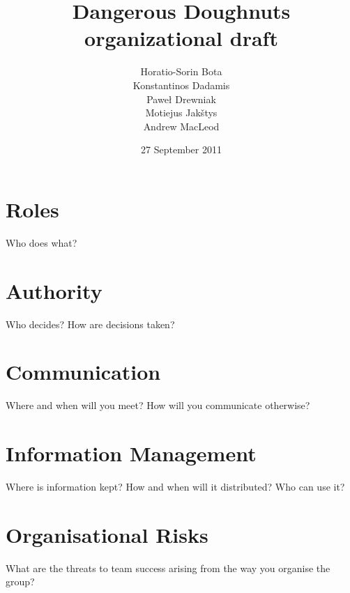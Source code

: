 \documentclass{article}
\begin{document}
\title{Dangerous Doughnuts organizational draft}
\author{Horatio-Sorin Bota \\
		Konstantinos Dadamis \\
		Paweł Drewniak \\
		Motiejus Jakštys \\
		Andrew MacLeod}

\date{27 September 2011}
\maketitle

\section{Roles}

Who does what?


\section{Authority}

Who decides?  How are decisions taken?


\section{Communication}

Where and when will you meet?  How will you communicate otherwise?


\section{Information Management}

Where is information kept?  How and when will it distributed?  Who can
use it?


\section{Organisational Risks}

What are the threats to team success arising from the way you organise
the group?




\end{document}
